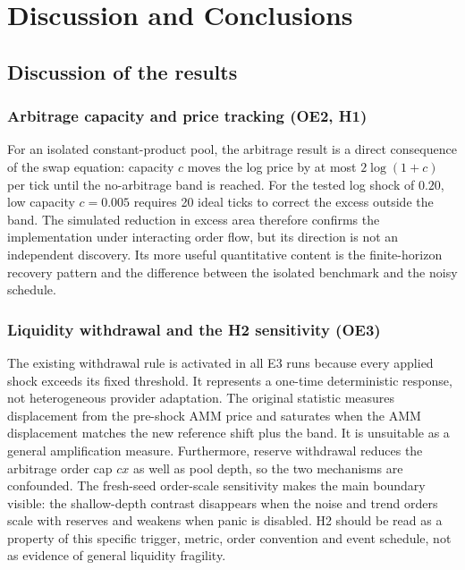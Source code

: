 \chapter{Discussion and Conclusions}
\label{cap:discusion}

\section{Discussion of the results}

\subsection{Arbitrage capacity and price tracking (OE2, H1)}

For an isolated constant-product pool, the arbitrage result is a direct consequence of the swap equation: capacity $c$ moves the log price by at most $2\log(1+c)$ per tick until the no-arbitrage band is reached. For the tested log shock of $0.20$, low capacity $c=0.005$ requires 20 ideal ticks to correct the excess outside the band. The simulated reduction in excess area therefore confirms the implementation under interacting order flow, but its direction is not an independent discovery. Its more useful quantitative content is the finite-horizon recovery pattern and the difference between the isolated benchmark and the noisy schedule.

\subsection{Liquidity withdrawal and the H2 sensitivity (OE3)}

The existing withdrawal rule is activated in all E3 runs because every applied shock exceeds its fixed threshold. It represents a one-time deterministic response, not heterogeneous provider adaptation. The original statistic measures displacement from the pre-shock AMM price and saturates when the AMM displacement matches the new reference shift plus the band. It is unsuitable as a general amplification measure. Furthermore, reserve withdrawal reduces the arbitrage order cap $c x$ as well as pool depth, so the two mechanisms are confounded. The fresh-seed order-scale sensitivity makes the main boundary visible: the shallow-depth contrast disappears when the noise and trend orders scale with reserves and weakens when panic is disabled. H2 should be read as a property of this specific trigger, metric, order convention and event schedule, not as evidence of general liquidity fragility.

